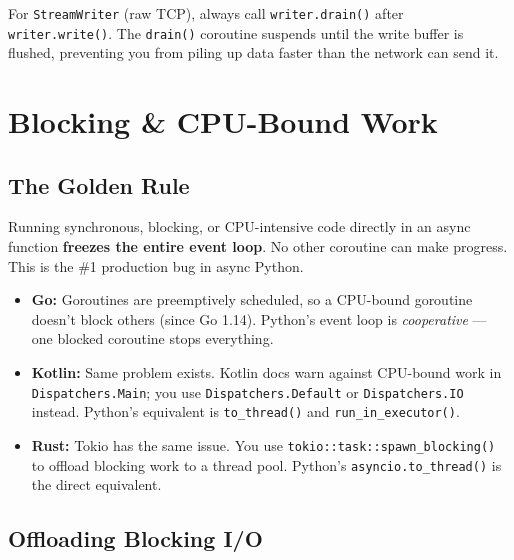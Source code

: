 \documentclass[11pt,a4paper,oneside]{book}
\newcommand{\py}[1]{\texttt{\color{pyblue}#1}}
\newcommand{\rustcode}[1]{\texttt{\color{BrickRed}#1}}
\begin{document}
\begin{infobox}
For \py{StreamWriter} (raw TCP), always call \py{writer.drain()} after \py{writer.write()}.
The \py{drain()} coroutine suspends until the write buffer is flushed, preventing you from
piling up data faster than the network can send it.
\end{infobox}

\chapter{Blocking \& CPU-Bound Work}

\section{The Golden Rule}

\begin{dangerbox}[title={Never block the event loop}]
Running synchronous, blocking, or CPU-intensive code directly in an async function
\textbf{freezes the entire event loop}. No other coroutine can make progress.
This is the \#1 production bug in async Python.
\end{dangerbox}

\begin{analogybox}
\begin{itemize}
    \item \textcolor{goblue}{\textbf{Go:}} Goroutines are preemptively scheduled, so a
          CPU-bound goroutine doesn't block others (since Go 1.14). Python's event loop is
          \emph{cooperative} --- one blocked coroutine stops everything.
    \item \textcolor{javaorange}{\textbf{Kotlin:}} Same problem exists. Kotlin docs warn against
          CPU-bound work in \texttt{Dispatchers.Main}; you use \texttt{Dispatchers.Default} or
          \texttt{Dispatchers.IO} instead. Python's equivalent is \py{to\_thread()} and
          \py{run\_in\_executor()}.
    \item \textcolor{BrickRed}{\textbf{Rust:}} Tokio has the same issue. You use
          \rustcode{tokio::task::spawn\_blocking()} to offload blocking work to a thread pool.
          Python's \py{asyncio.to\_thread()} is the direct equivalent.
\end{itemize}
\end{analogybox}

\section{Offloading Blocking I/O}
\end{document}
